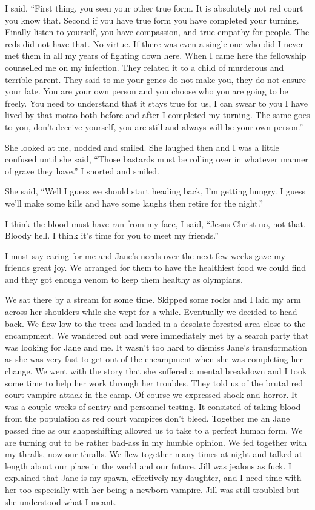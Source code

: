 I said, ``First thing, you seen your other true form. It is absolutely not red court you know that. Second if you have true form you have completed your turning. Finally listen to yourself, you have compassion, and true empathy for people. The reds did not have that. No virtue. If there was even a single one who did I never met them in all my years of fighting down here. When I came here the fellowship counselled me on my infection. They related it to a child of murderous and terrible parent. They said to me your genes do not make you, they do not ensure your fate. You are your own person and you choose who you are going to be freely. You need to understand that it stays true for us, I can swear to you I have lived by that motto both before and after I completed my turning. The same goes to you, don't deceive yourself, you are still and always will be your own person.''

She looked at me, nodded and smiled. She laughed then and I was a little confused until she said, ``Those bastards must be rolling over in whatever manner of grave they have.'' I snorted and smiled.

She said, ``Well I guess we should start heading back, I'm getting hungry. I guess we'll make some kills and have some laughs then retire for the night.''

I think the blood must have ran from my face, I said, ``Jesus Christ no, not that. Bloody hell. I think it's time for you to meet my friends.''

I must say caring for me and Jane's needs over the next few weeks gave my friends great joy. We arranged for them to have the healthiest food we could find and they got enough venom to keep them healthy as olympians.

\parasep

We sat there by a stream for some time. Skipped some rocks and I laid my arm across her shoulders while she wept for a while. Eventually we decided to head back. We flew low to the trees and landed in a desolate forested area close to the encampment. We wandered out and were immediately met by a search party that was looking for Jane and me. It wasn't too hard to dismiss Jane's transformation as she was very fast to get out of the encampment when she was completing her change. We went with the story that she suffered a mental breakdown and I took some time to help her work through her troubles. They told us of the brutal red court vampire attack in the camp. Of course we expressed shock and horror. It was a couple weeks of sentry and personnel testing. It consisted of taking blood from the population as red court vampires don't bleed. Together me an Jane passed fine as our shapeshifting allowed us to take to a perfect human form. We are turning out to be rather bad-ass in my humble opinion. We fed together with my thralls, now our thralls. We flew together many times at night and talked at length about our place in the world and our future. Jill was jealous as fuck. I explained that Jane is my spawn, effectively my daughter, and I need time with her too especially with her being a newborn vampire. Jill was still troubled but she understood what I meant.

